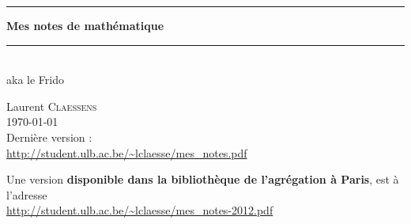 
\thispagestyle{empty}
\begin{center}
  \begin{minipage}{15cm}
    \hrule\par
    \vspace{2mm}
    \begin{center}
    \Huge \bfseries Mes notes de mathématique \par
    \end{center}
    \hrule\par
  \end{minipage}\\
  \vspace{0.2cm}
  aka le Frido
\end{center}

\vspace{2cm}

\begin{center}
    Laurent \textsc{Claessens}\\
    \today\\

    Dernière version :\\
    \url{http://student.ulb.ac.be/~lclaesse/mes_notes.pdf}

    \vspace{1cm}

    Une version {\bf disponible dans la bibliothèque de l'agrégation à Paris}, est à l'adresse\\
    \url{http://student.ulb.ac.be/~lclaesse/mes_notes-2012.pdf}



\end{center}

\vfill

\LogoEtLicence


